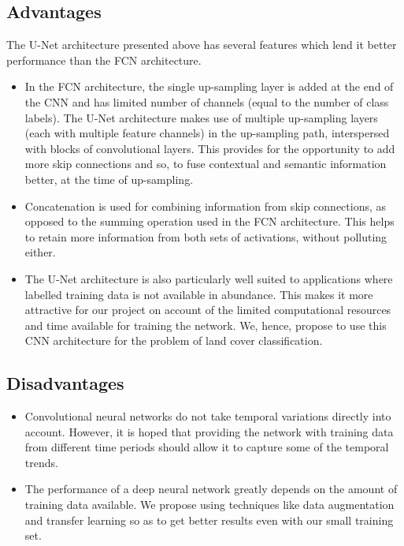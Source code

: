 \documentclass[12pt, a4paper]{report}
\begin{document}
\subsection{Advantages}
The U-Net architecture presented above has several features which lend it better performance than the FCN architecture.
\begin{itemize}
\item
In the FCN architecture, the single up-sampling layer is added at the end of the CNN and has limited number of channels (equal to the number of class labels). The U-Net architecture makes use of multiple up-sampling layers (each with multiple feature channels) in the up-sampling path, interspersed with blocks of convolutional layers. This provides for the opportunity to add more skip connections and so, to fuse contextual and semantic information better, at the time of up-sampling. 
\item
Concatenation is used for combining information from skip connections, as opposed to the summing operation used in the FCN architecture. This helps to retain more information from both sets of activations, without polluting either.
\item
The U-Net architecture is also particularly well suited to applications where labelled training data is not available in abundance. This makes it more attractive for our project on account of the limited computational resources and time available for training the network. We, hence, propose to use this CNN architecture for the problem of land cover classification.
\end{itemize}
\subsection{Disadvantages}
\begin{itemize}
\item Convolutional neural networks do not take temporal variations directly into account. However, it is hoped that providing the network with training data from different time periods should allow it to capture some of the temporal trends.
\item The performance of a deep neural network greatly depends on the amount of training data available. We propose using techniques like data augmentation and transfer learning so as to get better results even with our small training set.
\end{itemize}

\end{document}
